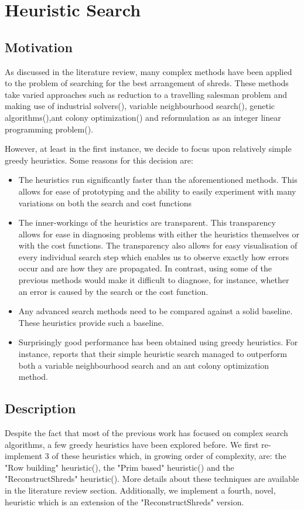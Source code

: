 \chapter{Heuristic Search}
\label{chap5}
\section{Motivation}
As discussed in the literature review, many complex methods have been applied to the problem of searching for the best arrangement of shreds. These methods take varied approaches such as reduction to a travelling salesman problem and making use of industrial solvers(\cite{P1}), variable neighbourhood search(\cite{P1,P5,P7}), genetic algorithms(\cite{P7}),ant colony optimization(\cite{P5}) and reformulation as an integer linear programming problem(\cite{P6}).

However, at least in the first instance, we decide to focus upon relatively simple greedy heuristics. Some reasons for this decision are:
\begin{itemize}
\item The heuristics run significantly faster than the aforementioned methods. This allows for ease of prototyping and the ability to easily experiment with many variations on both the search and cost functions
\item The inner-workings of the heuristics are transparent. This transparency allows for ease in diagnosing problems with either the heuristics themselves or with the cost functions. The transparency also allows for easy visualisation of every individual search step which enables us to observe exactly how errors occur and are how they are propagated. In contrast, using some of the previous methods would make it difficult to diagnose, for instance, whether an error is caused by the search or the cost function.
\item Any advanced search methods need to be compared against a solid baseline. These heuristics provide such a baseline.
\item Surprisingly good performance has been obtained using greedy heuristics. For instance, \cite{P2} reports that their simple heuristic search managed to outperform both a variable neighbourhood search and an ant colony optimization method.
\end{itemize}

\section{Description}
Despite the fact that most of the previous work has focused on complex search algorithms, a few greedy heuristics have been explored before. We first re-implement 3 of these heuristics which, in growing order of complexity, are: the "Row building" heuristic(\cite{P5}), the "Prim based" heuristic(\cite{P5}) and the "ReconstructShreds" heuristic(\cite{P2}). More details about these techniques are available in the literature review section.  Additionally, we implement a fourth, novel, heuristic which is an extension of the "ReconstructShreds" version. 

